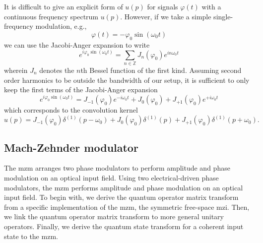 It is difficult to give an explicit form of $u(p)$ for signals $\varphi(t)$ with a continuous frequency spectrum $u(p)$.
However, if we take a simple single-frequency modulation, e.g.,
\begin{equation}
	\varphi(t)
	=
	-
	\varphi_0
	\sin(\omega_0t)
\end{equation}
we can use the Jacobi-Anger expansion to write
\begin{equation}
	e^{i\varphi_0\sin(\omega_0t)}
	=
	\sum_{n\in\mathbb{Z}}
	J_n(\varphi_0)
	e^{in\omega_0 t}
\end{equation}
wherein $J_n$ denotes the $n$th Bessel function of the first kind.
Assuming second order harmonics to be outside the bandwidth of our setup, it is sufficient to only keep the first terms of the Jacobi-Anger expansion
\begin{equation}
	e^{i\varphi_0\sin(\omega_0t)}
	=
	J_{-1}(\varphi_0)
	e^{-i\omega_0t}
	+
	J_0(\varphi_0)
	+
	J_{+1}(\varphi_0)
	e^{+i\omega_0t}
\end{equation}
which corresponds to the convolution kernel
\begin{equation}
	u(p)
	=
	J_{-1}(\varphi_0)
	\delta^{(1)}(p-\omega_0)
	+
	J_0(\varphi_0)
	\delta^{(1)}(p)
	+
	J_{+1}(\varphi_0)
	\delta^{(1)}(p+\omega_0)
	.
\end{equation}

\subsection{Mach-Zehnder modulator}

The \gls{mzm} arranges two phase modulators to perform amplitude and phase modulation on an optical input field.
Using two electrical-driven phase modulators, the \gls{mzm} performs amplitude and phase modulation on an optical input field.
To begin with, we derive the quantum operator matrix transform from a specific implementation of the \gls{mzm}, the symmetric free-space \gls{mzi}.
Then, we link the quantum operator matrix transform to more general unitary operators.
Finally, we derive the quantum state transform for a coherent input state to the \gls{mzm}.

